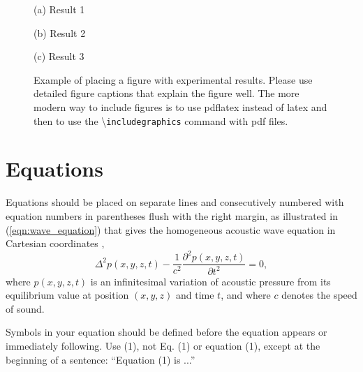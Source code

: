 \documentclass[a4paper,10pt,oneside]{article}
\begin{document}
\begin{sloppy}
\begin{figure}[h]
\begin{minipage}[h]{1.0\columnwidth}
  \centering
  \centerline{}
  \centerline{(a) Result 1}\medskip
\end{minipage}
\begin{minipage}[h]{0.48\columnwidth}
  \centering
  \centerline{}
  \centerline{(b) Result 2}\medskip
\end{minipage}
\hfill
\begin{minipage}[h]{0.48\columnwidth}
  \centering
  \centerline{}
  \centerline{(c) Result 3}\medskip
\end{minipage}
\caption{Example of placing a figure with experimental results. Please use detailed figure captions that explain the figure well. The more modern way to include figures is to use pdflatex instead of latex and then to use 
the \textbackslash\texttt{includegraphics} command with pdf files.}
\label{fig:results}
%
\end{figure}

\section{Equations}
\label{sec:equations}

Equations should be placed on separate lines and consecutively numbered with equation numbers in parentheses flush with the right margin, as illustrated in (\ref{eqn:wave_equation}) that gives the homogeneous acoustic wave equation in Cartesian coordinates \cite{eWilliams1999},
\begin{equation}
  \label{eqn:wave_equation}
    \Delta^2p(x,y,z,t)-
    \displaystyle\frac{1}{c^2}\frac{\partial^2p(x,y,z,t)}{\partial t^2}=0,
\end{equation}
where $p(x,y,z,t)$ is an infinitesimal variation of acoustic pressure from its equilibrium value at position $(x,y,z)$ and time $t$, and where $c$ denotes the speed of sound.

Symbols in your equation should be defined before the equation appears or immediately following. Use (1), not Eq. (1) or equation (1), except at the beginning of a sentence: ``Equation (1) is ...''


\end{sloppy}
\end{document}
